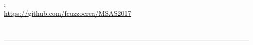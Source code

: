 \thispagestyle{empty}

\hfill
\vspace{5cm}
\strong{ }\\

\vfill

\begin{multicols}{2}
\medskip
{}: \\
\url{https://github.com/fcuzzocrea/MSAS2017}


\medskip
\noindent{\sscap{}} \\
\mail{\myEmail}
\vfill
\columnbreak

\end{multicols}
\vspace{1cm}
\hrule
\bigskip
\clearpage
